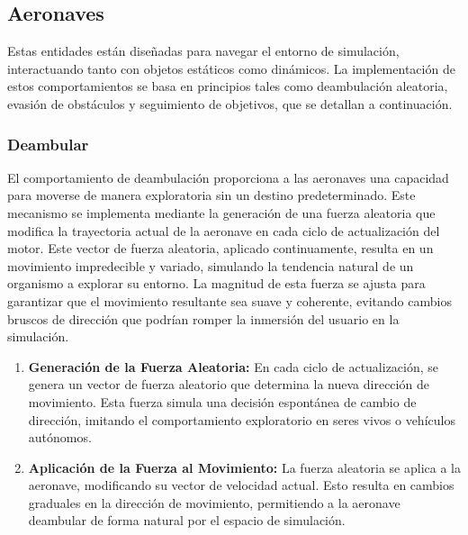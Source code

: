 \subsection{Aeronaves}
Estas entidades están diseñadas para navegar el entorno de simulación, interactuando tanto con objetos estáticos como dinámicos. La implementación de estos comportamientos se basa en principios  tales como deambulación aleatoria, evasión de obstáculos y seguimiento de objetivos, que se detallan a continuación.
\subsubsection{Deambular}
El comportamiento de deambulación proporciona a las aeronaves una capacidad para moverse de manera exploratoria sin un destino predeterminado. Este mecanismo se implementa mediante la generación de una fuerza aleatoria que modifica la trayectoria actual de la aeronave en cada ciclo de actualización del motor. Este vector de fuerza aleatoria, aplicado continuamente, resulta en un movimiento impredecible y variado, simulando la tendencia natural de un organismo a explorar su entorno. La magnitud de esta fuerza se ajusta para garantizar que el movimiento resultante sea suave y coherente, evitando cambios bruscos de dirección que podrían romper la inmersión del usuario en la simulación.
\begin{enumerate}
    \item \textbf{Generación de la Fuerza Aleatoria:} En cada ciclo de actualización, se genera un vector de fuerza aleatorio que determina la nueva dirección de movimiento. Esta fuerza simula una decisión espontánea de cambio de dirección, imitando el comportamiento exploratorio en seres vivos o vehículos autónomos.
    \item \textbf{Aplicación de la Fuerza al Movimiento:} La fuerza aleatoria se aplica a la aeronave, modificando su vector de velocidad actual. Esto resulta en cambios graduales en la dirección de movimiento, permitiendo a la aeronave deambular de forma natural por el espacio de simulación. 
\end{enumerate}

